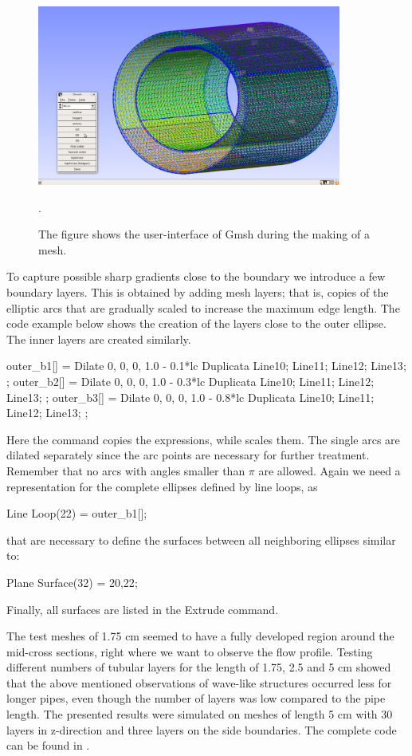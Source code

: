 \begin{figure}\begin{center}
\includegraphics[width=100mm]{chapters/hentschel/pdf/gmsh.pdf}
\caption{The figure shows the user-interface of Gmsh during the making of a mesh.}
\label{fig:Gmsh_mesh}.
\end{center}\end{figure}

To capture possible sharp gradients close to the boundary we introduce
a few boundary layers.  This is obtained by adding mesh layers; that
is, copies of the elliptic arcs that are gradually scaled to increase
the maximum edge length. The code example below shows the creation of
the layers close to the outer ellipse. The inner layers are created
similarly.
\begin{anycode}
outer_b1[] = Dilate {{0, 0, 0}, 1.0 - 0.1*lc } {
Duplicata{  Line{10}; Line{11}; Line{12}; Line{13}; } };
outer_b2[] = Dilate {{0, 0, 0}, 1.0 - 0.3*lc } {
Duplicata{  Line{10}; Line{11}; Line{12}; Line{13}; } };
outer_b3[] = Dilate {{0, 0, 0}, 1.0 - 0.8*lc } {
Duplicata{  Line{10}; Line{11}; Line{12}; Line{13}; } };
\end{anycode}
Here the command  copies the expressions, while  scales them.
The single arcs are dilated separately since the arc points are necessary for further treatment. Remember that no arcs with angles smaller than $\pi$ are allowed. Again we need a representation for the complete ellipses defined by line loops, as
\begin{anycode}
Line Loop(22) = {outer_b1[]};
\end{anycode}
that are necessary to define the surfaces between all neighboring ellipses similar to:
\begin{anycode}
Plane Surface(32) = {20,22};
\end{anycode}
Finally, all surfaces are listed in the Extrude command.

The test meshes of 1.75 cm seemed to have a fully developed region
around the mid-cross sections, right where we want to observe the flow
profile. Testing different numbers of tubular layers for the length of
1.75, 2.5 and 5 cm showed that the above mentioned observations of
wave-like structures occurred less for longer pipes, even though the
number of layers was low compared to the pipe length.  The presented
results were simulated on meshes of length 5 cm with 30 layers in
z-direction and three layers on the side boundaries. The complete code
can be found in .

